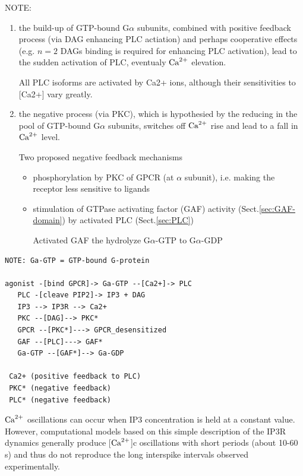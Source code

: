 NOTE:
\begin{enumerate}
  \item  the build-up of GTP-bound G$\alpha$ subunits, 
  combined with positive feedback process (via DAG enhancing PLC actiation) and
  perhaps cooperative effects (e.g. $n=2$ DAGs binding is required for
  enhancing PLC activation), lead to the sudden activation of PLC, eventualy
  ${\text{Ca}^{2+}}$ elevation.
  
All PLC isoforms are activated by Ca2+ ions, although their sensitivities to
[Ca2+] vary greatly.

  
  \item the negative process (via PKC), which is hypothesied by the reducing in
  the pool of GTP-bound G$\alpha$ subunits, switches off ${\text{Ca}^{2+}}$ rise and lead to a fall in
  ${\text{Ca}^{2+}}$ level.
  
  Two proposed negative feedback mechanisms
  \begin{itemize}
    \item  phosphorylation by PKC of GPCR (at $\alpha$ subunit), i.e. making
    the receptor less sensitive to ligands
    
    \item stimulation of GTPase activating factor (GAF) activity
    (Sect.\ref{sec:GAF-domain}) by activated PLC (Sect.\ref{sec:PLC})
    
    Activated GAF the hydrolyze G$\alpha$-GTP to G$\alpha$-GDP
  \end{itemize}
  
\end{enumerate}



\begin{verbatim}
NOTE: Ga-GTP = GTP-bound G-protein

agonist -[bind GPCR]-> Ga-GTP --[Ca2+]-> PLC 
   PLC -[cleave PIP2]-> IP3 + DAG 
   IP3 --> IP3R --> Ca2+ 
   PKC --[DAG]--> PKC*
   GPCR --[PKC*]---> GPCR_desensitized
   GAF --[PLC]---> GAF*
   Ga-GTP --[GAF*]--> Ga-GDP

 Ca2+ (positive feedback to PLC)
 PKC* (negative feedback)
 PLC* (negative feedback)
\end{verbatim}

${\text{Ca}^{2+}}$ oscillations can occur when IP3 concentration is held at a constant value.
However, computational models based on this simple description of the IP3R
dynamics generally produce [${\text{Ca}^{2+}}$]c oscillations with short periods (about 10-60
s) and thus do not reproduce the long interspike intervals observed
experimentally. 

